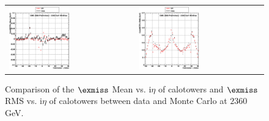 \begin{figure}[h!]
 \centering
 \begin{tabular}{ll}
  \includegraphics[width=0.5\textwidth]{plots_DataVsMC_MB_2360GeV/g_calometPxMean_vs_ieta_2360.eps} &
  \includegraphics[width=0.5\textwidth]{plots_DataVsMC_MB_2360GeV/g_calometPxRMS_vs_ieta_2360.eps} \\
 \end{tabular}
 \caption{\small Comparison of the $\exmiss$ Mean vs. i$\eta$ of calotowers and $\exmiss$ RMS vs. i$\eta$ of calotowers between 
          data and Monte Carlo at $2360$ GeV.\label{fig:METx_MeanRMS_vs_ieta_2360}}
\end{figure}

